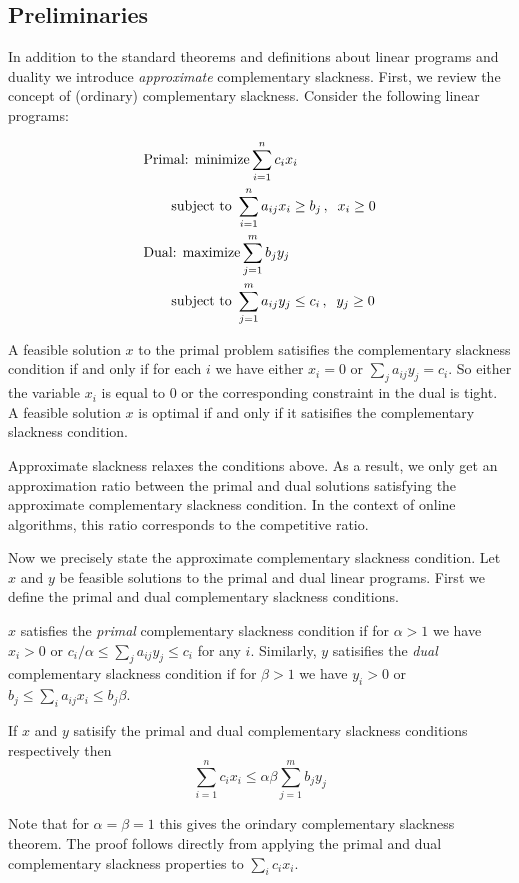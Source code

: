 \subsection{Preliminaries}
In addition to the standard theorems and definitions about linear programs and duality we introduce \emph{approximate} complementary slackness.
First, we review the concept of (ordinary) complementary slackness.
Consider the following linear programs:

\vspace{-.5cm}
\begin{align*}
& \textnormal{Primal: } \textnormal{minimize} \sum_{i=1}^n c_i x_i \\
 &\qquad \textnormal{subject to } \sum_{i=1}^n a_{ij} x_i  \geq b_j \, , \;\; x_i \geq 0 \\
& \textnormal{Dual: } \textnormal{maximize} \sum_{j=1}^m b_j y_j \\
 &\qquad \textnormal{subject to } \sum_{j=1}^m a_{ij} y_j \leq c_i \, , \;\; y_j \geq 0
\end{align*}
\vspace{-.5cm}

A feasible solution $x$ to the primal problem satisifies the complementary slackness condition if and only if for each $i$ we have either $x_i = 0$ or $\sum_{j} a_{ij}y_j = c_i$.
So either the variable $x_i$ is equal to 0 or the corresponding constraint in the dual is tight.
A feasible solution $x$ is optimal if and only if it satisifies the complementary slackness condition.

Approximate slackness relaxes the conditions above.
As a result, we only get an approximation ratio between the primal and dual solutions satisfying the approximate complementary slackness condition.
In the context of online algorithms, this ratio corresponds to the competitive ratio.

Now we precisely state the approximate complementary slackness condition.
Let $x$ and $y$ be feasible solutions to the primal and dual linear programs.
First we define the primal and dual complementary slackness conditions.

$x$ satisfies the \emph{primal} complementary slackness condition if for $\alpha > 1$ we have $x_i > 0$ or $c_i / \alpha \leq \sum_j a_{ij} y_j \leq c_i$ for any $i$.
Similarly, $y$ satisifies the \emph{dual} complementary slackness condition if for $\beta > 1$ we have $y_i > 0$ or $b_j \leq \sum_i a_{ij} x_i \leq b_j \beta$.

If $x$ and $y$ satisify the primal and dual complementary slackness conditions respectively then 
\[
\sum_{i=1}^n c_i x_i  \leq \alpha \beta  \sum_{j=1}^m b_j y_j
\]

Note that for $\alpha = \beta = 1$ this gives the orindary complementary slackness theorem.
The proof follows directly from applying the primal and dual complementary slackness properties to $\sum_i c_i x_i$.
